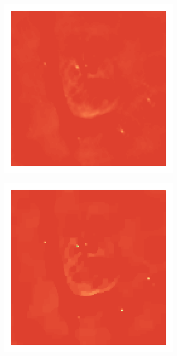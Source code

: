 \begin{figure}[h]
	\begin{subfigure}[b]{0.24\linewidth}
		\vspace{10pt}
		\includegraphics[width=\linewidth, trim={18px 19px 18px 18px}, clip]{./chapters/05.results/g55/L2_model.png}
	\end{subfigure}
	\begin{subfigure}[b]{0.24\linewidth}
		\includegraphics[width=\linewidth, trim={18px 19px 18px 18px}, clip]{./chapters/05.results/g55/TV_model.png}

\end{subfigure}
\end{figure}

